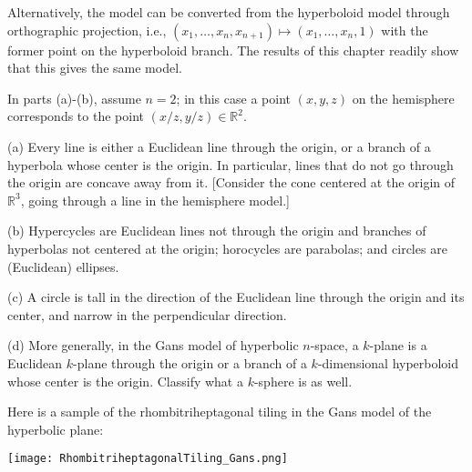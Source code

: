 \documentclass[leqno]{book}
\begin{document}
\begin{enumerate}
Alternatively, the model can be converted from the hyperboloid model through orthographic projection, i.e., $(x_1,\dots,x_n,x_{n+1})\mapsto(x_1,\dots,x_n,1)$ with the former point on the hyperboloid branch.  The results of this chapter readily show that this gives the same model.

In parts (a)-(b), assume $n=2$; in this case a point $(x,y,z)$ on the hemisphere corresponds to the point $(x/z,y/z)\in\mathbb R^2$.

(a) Every line is either a Euclidean line through the origin, or a branch of a hyperbola whose center is the origin.  In particular, lines that do not go through the origin are concave away from it.  [Consider the cone centered at the origin of $\mathbb R^3$, going through a line in the hemisphere model.]

(b) Hypercycles are Euclidean lines not through the origin and branches of hyperbolas not centered at the origin; horocycles are parabolas; and circles are (Euclidean) ellipses.

(c) A circle is tall in the direction of the Euclidean line through the origin and its center, and narrow in the perpendicular direction.

(d) More generally, in the Gans model of hyperbolic $n$-space, a $k$-plane is a Euclidean $k$-plane through the origin or a branch of a $k$-dimensional hyperboloid whose center is the origin.  Classify what a $k$-sphere is as well.

Here is a sample of the rhombitriheptagonal tiling in the Gans model of the hyperbolic plane:
\begin{center}
\texttt{[image: RhombitriheptagonalTiling\_Gans.png]}
\end{center}
\end{enumerate}
\end{document}
